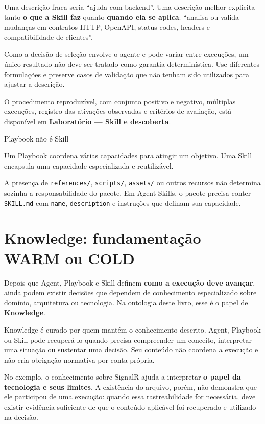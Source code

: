 \documentclass[
  10pt,
  a4paper,
  oneside]{book}
\begin{document}
Uma descrição fraca seria ``ajuda com backend''. Uma descrição melhor
explicita tanto \textbf{o que a Skill faz} quanto \textbf{quando ela se
aplica}: ``analisa ou valida mudanças em contratos HTTP, OpenAPI, status
codes, headers e compatibilidade de clientes''.

Como a decisão de seleção envolve o agente e pode variar entre
execuções, um único resultado não deve ser tratado como garantia
determinística. Use diferentes formulações e preserve casos de validação
que não tenham sido utilizados para ajustar a descrição.

O procedimento reproduzível, com conjunto positivo e negativo, múltiplas
execuções, registro das ativações observadas e critérios de avaliação,
está disponível em
\textbf{\protect\hyperlink{laboratorio-skill-descoberta}{Laboratório ---
Skill e descoberta}}.

\begin{tipbox}{Playbook não é Skill}

Um Playbook coordena várias capacidades para atingir um objetivo. Uma
Skill encapsula uma capacidade especializada e reutilizável.

A presença de \texttt{references/}, \texttt{scripts/}, \texttt{assets/}
ou outros recursos não determina sozinha a responsabilidade do pacote.
Em Agent Skills, o pacote precisa conter \texttt{SKILL.md} com
\texttt{name}, \texttt{description} e instruções que definam sua
capacidade.

\end{tipbox}

\hypertarget{knowledge-fundamentauxe7uxe3o-warm-ou-cold}{%
\section{Knowledge: fundamentação WARM ou
COLD}\label{knowledge-fundamentauxe7uxe3o-warm-ou-cold}}

Depois que Agent, Playbook e Skill definem \textbf{como a execução deve
avançar}, ainda podem existir decisões que dependem de conhecimento
especializado sobre domínio, arquitetura ou tecnologia. Na ontologia
deste livro, esse é o papel de \textbf{Knowledge}.

Knowledge é curado por quem mantém o conhecimento descrito. Agent,
Playbook ou Skill pode recuperá-lo quando precisa compreender um
conceito, interpretar uma situação ou sustentar uma decisão. Seu
conteúdo não coordena a execução e não cria obrigação normativa por
conta própria.

No exemplo, o conhecimento sobre SignalR ajuda a interpretar \textbf{o
papel da tecnologia e seus limites}. A existência do arquivo, porém, não
demonstra que ele participou de uma execução: quando essa
rastreabilidade for necessária, deve existir evidência suficiente de que
o conteúdo aplicável foi recuperado e utilizado na decisão.
\end{document}
